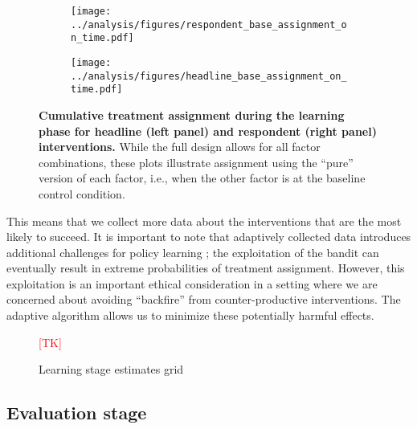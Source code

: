 \documentclass[letterpaper, 12pt, parskip=full,DIV=10]{scrartcl}
\begin{document}
\begin{figure}[H]
\centering
\begin{subfigure}[b]{0.5\textwidth}
        \centering
        \texttt{[image: ../analysis/figures/respondent\_base\_assignment\_on\_time.pdf]}
    \end{subfigure}%
    \begin{subfigure}[b]{0.5\textwidth}
        \centering
        \texttt{[image: ../analysis/figures/headline\_base\_assignment\_on\_time.pdf]}
    \end{subfigure}
   \caption{\textbf{Cumulative treatment assignment during the learning phase for headline (left panel) and respondent (right panel) interventions.} While the full design allows for all factor combinations, these plots illustrate assignment using the ``pure'' version of each factor, i.e., when the other factor is at the baseline control condition.}
   \label{fig:learning_cumulative}
\end{figure}


This means that we collect more data about the interventions that are the most likely to succeed. It is important to note that adaptively collected data introduces additional challenges for policy learning \citep{zhan2021policy}; the exploitation of the bandit can eventually result in extreme probabilities of treatment assignment. However, this exploitation is an important ethical consideration in a setting where we are concerned about avoiding ``backfire'' from counter-productive interventions. The adaptive algorithm allows us to minimize these potentially harmful effects. %

\begin{figure}[H]
\centering
\textcolor{red}{[TK]}
   \caption{Learning stage estimates grid}
   \label{fig:learning_estimates}
\end{figure}



\subsection{Evaluation stage}\label{appendix:evaluation}

\newpage
\end{document}
